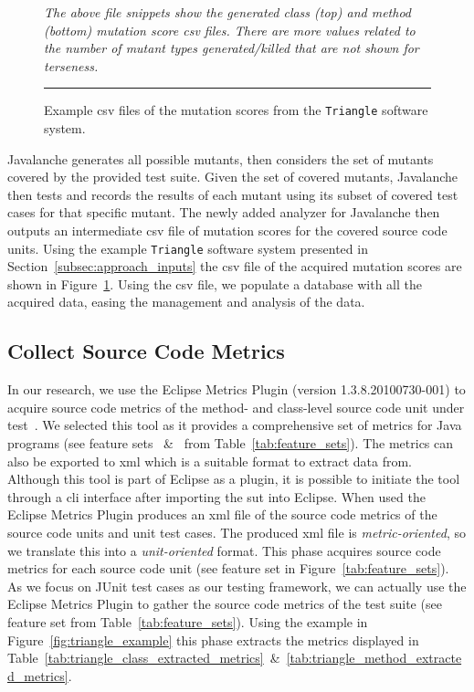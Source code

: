 \begin{figure}[!tb]
  \centering
  
  
  \caption{Example \gls{csv} files of the mutation scores from the \texttt{Triangle} software system.}
  \vspace{1mm}
  \footnotesize{\emph{The above file snippets show the generated class (top) and method (bottom) mutation score \gls{csv} files. There are more values related to the number of mutant types generated/killed that are not shown for terseness.}}
  \vspace{2mm}
  \hrule
  \label{fig:triangle_mutation_scores}
\end{figure}

Javalanche generates all possible mutants, then considers the set of mutants covered by the provided test suite. Given the set of covered mutants, Javalanche then tests and records the results of each mutant using its subset of covered test cases for that specific mutant. The newly added analyzer for Javalanche then outputs an intermediate \gls{csv} file of mutation scores for the covered source code units. Using the example \texttt{Triangle} software system presented in Section~\ref{subsec:approach_inputs} the \gls{csv} file of the acquired mutation scores are shown in Figure~\ref{fig:triangle_mutation_scores}. Using the \gls{csv} file, we populate a database with all the acquired data, easing the management and analysis of the data.


\subsection{Collect Source Code Metrics}
\label{subsec:approach_collect_source_metrics}
In our research, we use the Eclipse Metrics Plugin (version 1.3.8.20100730-001) to acquire source code metrics of the method- and class-level source code unit under test~\cite{Metrics}. We selected this tool as it provides a comprehensive set of metrics for Java programs (see feature sets ~\&~ from Table~\ref{tab:feature_sets}). The metrics can also be exported to \gls{xml} which is a suitable format to extract data from. Although this tool is part of Eclipse as a plugin, it is possible to initiate the tool through a \gls{cli} interface after importing the \gls{sut} into Eclipse. When used the Eclipse Metrics Plugin produces an \gls{xml} file of the source code metrics of the source code units and unit test cases. The produced \gls{xml} file is \emph{metric-oriented}, so we translate this into a \emph{unit-oriented} format. This phase acquires source code metrics for each source code unit (see feature set  in Figure~\ref{tab:feature_sets}). As we focus on JUnit test cases as our testing framework, we can actually use the Eclipse Metrics Plugin to gather the source code metrics of the test suite (see feature set  from Table~\ref{tab:feature_sets}). Using the example in Figure~\ref{fig:triangle_example} this phase extracts the metrics displayed in Table~\ref{tab:triangle_class_extracted_metrics}~\&~\ref{tab:triangle_method_extracted_metrics}.

